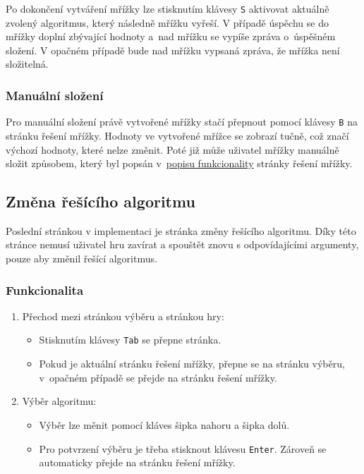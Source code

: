 Po dokončení vytváření mřížky lze stisknutím klávesy \texttt{S} aktivovat
aktuálně zvolený algoritmus, který následně mřížku vyřeší. V případě úspěchu
se do mřížky doplní zbývající hodnoty a~nad mřížku se vypíše zpráva o~úspěšném
složení. V opačném případě bude nad mřížku vypsaná zpráva, že mřížka není
složitelná.

\subsubsection*{Manuální složení}

Pro manuální složení právě vytvořené mřížky stačí přepnout pomocí klávesy
\texttt{B} na stránku řešení mřížky. Hodnoty ve vytvořené mřížce se zobrazí
tučně, což značí výchozí hodnoty, které nelze změnit. Poté již může uživatel
mřížky manuálně složit způsobem, který byl popsán
v~\hyperref[sec:board-solving]{popisu funkcionality} stránky řešení mřížky.

\subsection{Změna řešícího algoritmu}

Poslední stránkou v implementaci je stránka změny řešícího algoritmu. Díky
této stránce nemusí uživatel hru zavírat a spouštět znovu s odpovídajícími
argumenty, pouze aby změnil řešící algoritmus.

\subsubsection*{Funkcionalita}

\begin{enumerate}
    \item Přechod mezi stránkou výběru a stránkou hry:
    \begin{itemize}
        \item Stisknutím klávesy \texttt{Tab} se přepne stránka.
        \item Pokud je aktuální stránku řešení mřížky, přepne se na stránku
            výběru, v~opačném případě se přejde na stránku řešení mřížky.
    \end{itemize}
    \item Výběr algoritmu:
    \begin{itemize}
        \item Výběr lze měnit pomocí kláves šipka nahoru a šipka dolů.
        \item Pro potvrzení výběru je třeba stisknout klávesu \texttt{Enter}.
            Zároveň se automaticky přejde na stránku řešení mřížky.
    \end{itemize}
\end{enumerate}

